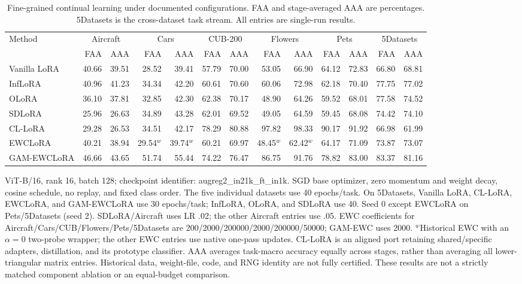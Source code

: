 \begin{table}[t]
\centering
\caption{Fine-grained continual learning under documented configurations. FAA and stage-averaged AAA are percentages. 5Datasets is the cross-dataset task stream. All entries are single-run results.}
\label{tab:exp_fine}
\scriptsize\setlength{\tabcolsep}{2.2pt}\renewcommand{\arraystretch}{1.08}
\begin{tabular*}{\linewidth}{@{\extracolsep{\fill}}l*{12}{r}@{}}
\toprule
Method & \multicolumn{2}{c}{Aircraft} & \multicolumn{2}{c}{Cars} & \multicolumn{2}{c}{CUB-200} & \multicolumn{2}{c}{Flowers} & \multicolumn{2}{c}{Pets} & \multicolumn{2}{c}{5Datasets}\\
\cmidrule(lr){2-3}\cmidrule(lr){4-5}\cmidrule(lr){6-7}\cmidrule(lr){8-9}\cmidrule(lr){10-11}\cmidrule(lr){12-13}
 & FAA & AAA & FAA & AAA & FAA & AAA & FAA & AAA & FAA & AAA & FAA & AAA\\\midrule
Vanilla LoRA & 40.66 & 39.51 & 28.52 & 39.41 & 57.79 & 70.00 & 53.05 & 66.90 & 64.12 & 72.83 & 66.80 & 68.81\\
InfLoRA & 40.96 & 41.23 & 34.34 & 42.20 & 60.61 & 70.60 & 60.06 & 72.98 & 62.18 & 70.40 & 77.75 & 77.02\\
OLoRA & 36.10 & 37.81 & 32.85 & 42.30 & 62.38 & 70.17 & 48.90 & 64.26 & 59.52 & 68.01 & 77.58 & 74.52\\
SDLoRA & 25.96 & 26.63 & 34.89 & 43.28 & 62.01 & 69.52 & 49.05 & 64.59 & 59.45 & 68.08 & 74.42 & 74.10\\
CL-LoRA & 29.28 & 26.53 & 34.51 & 42.17 & 78.29 & 80.88 & 97.82 & 98.33 & 90.17 & 91.92 & 66.98 & 61.99\\
EWCLoRA & 40.21 & 38.94 & 29.54$^{w}$ & 39.74$^{w}$ & 60.21 & 69.97 & 48.45$^{w}$ & 62.42$^{w}$ & 64.17 & 71.09 & 73.87 & 73.07\\
GAM-EWCLoRA & 46.66 & 43.65 & 51.74 & 55.44 & 74.22 & 76.47 & 86.75 & 91.76 & 78.82 & 83.00 & 83.37 & 81.16\\
\bottomrule\end{tabular*}
\par\vspace{3pt}\begin{minipage}{\linewidth}\scriptsize
ViT-B/16, rank 16, batch 128; checkpoint identifier: augreg2\_in21k\_ft\_in1k. SGD base optimizer, zero momentum and weight decay, cosine schedule, no replay, and fixed class order. The five individual datasets use 40 epochs/task. On 5Datasets, Vanilla LoRA, CL-LoRA, EWCLoRA, and GAM-EWCLoRA use 30 epochs/task; InfLoRA, OLoRA, and SDLoRA use 40. Seed 0 except EWCLoRA on Pets/5Datasets (seed 2). SDLoRA/Aircraft uses LR .02; the other Aircraft entries use .05. EWC coefficients for Aircraft/Cars/CUB/Flowers/Pets/5Datasets are 200/2000/200000/2000/200000/50000; GAM-EWC uses 2000. $^{w}$Historical EWC with an $\alpha=0$ two-probe wrapper; the other EWC entries use native one-pass updates. CL-LoRA is an aligned port retaining shared/specific adapters, distillation, and its prototype classifier. AAA averages task-macro accuracy equally across stages, rather than averaging all lower-triangular matrix entries. Historical data, weight-file, code, and RNG identity are not fully certified. These results are not a strictly matched component ablation or an equal-budget comparison.

\end{minipage}
\end{table}
